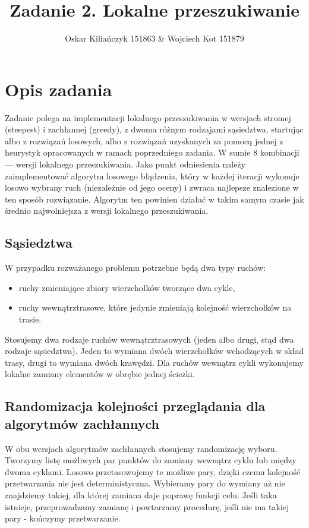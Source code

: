 \documentclass[11pt]{article}
\title{Zadanie 2. Lokalne przeszukiwanie}
\author{Oskar Kiliańczyk 151863 \& Wojciech Kot 151879}
\date{}
\begin{document}
\maketitle
\newpage

\section{Opis zadania}\label{sec:opis-zadania}
Zadanie polega na implementacji lokalnego przeszukiwania w wersjach stromej (steepest) i zachłannej (greedy), z dwoma różnym rodzajami sąsiedztwa,
startując albo z rozwiązań losowych, albo z rozwiązań uzyskanych za pomocą jednej z heurystyk opracowanych w ramach poprzedniego zadania.
W sumie 8 kombinacji --- wersji lokalnego przeszukiwania.
Jako punkt odniesienia należy zaimplementować algorytm losowego błądzenia, który w każdej iteracji wykonuje losowo wybrany ruch (niezależnie od jego oceny) i zwraca najlepsze znalezione w ten sposób rozwiązanie.
Algorytm ten powinien działać w takim samym czasie jak średnio najwolniejsza z wersji lokalnego przeszukiwania.

\subsection{Sąsiedztwa}\label{subsec:sasiedztwa}
W przypadku rozważanego problemu potrzebne będą dwa typy ruchów:
\begin{itemize}
\item ruchy zmieniające zbiory wierzchołków tworzące dwa cykle,
\item ruchy wewnątrztrasowe, które jedynie zmieniają kolejność wierzchołków na trasie.
\end{itemize}
Stosujemy dwa rodzaje ruchów wewnątrztrasowych (jeden albo drugi, stąd dwa rodzaje sąsiedztwa).
Jeden to wymiana dwóch wierzchołków wchodzących w skład trasy, drugi to wymiana dwóch krawędzi.
Dla ruchów wewnątrz cykli wykonujemy lokalne zamiany elementów w obrębie jednej ścieżki.

\subsection{Randomizacja kolejności przeglądania dla algorytmów zachłannych}\label{subsec:randomizacja-kolejnosci-przegladania-dla-algorytmow-zachannych}
W obu wersjach algorytmów zachłannych stosujemy randomizację wyboru.
Tworzymy listę możliwych par punktów do zamiany wewnątrz cyklu lub między dwoma cyklami.
Losowo przetasowujemy te możliwe pary, dzięki czemu kolejność przetwarzania nie jest deterministyczna.
Wybieramy pary do wymiany aż nie znajdziemy takiej, dla której zamiana daje poprawę funkcji celu.
Jeśli taka istnieje, przeprowadzamy zamianę i powtarzamy procedurę, jeśli nie ma takiej pary - kończymy przetwarzanie.
\end{document}
